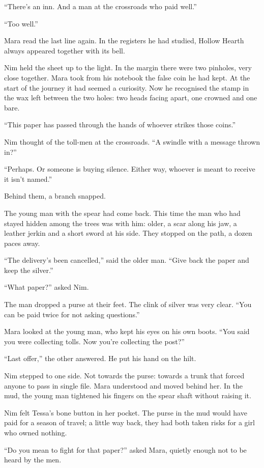 \documentclass[10pt,a4paper]{article}
\begin{document}
“There's an inn. And a man at the crossroads who paid well.”

“Too well.”

Mara read the last line again. In the registers he had studied, Hollow Hearth always appeared together with its bell.

Nim held the sheet up to the light. In the margin there were two pinholes, very close together. Mara took from his notebook the false coin he had kept. At the start of the journey it had seemed a curiosity. Now he recognised the stamp in the wax left between the two holes: two heads facing apart, one crowned and one bare.

“This paper has passed through the hands of whoever strikes those coins.”

Nim thought of the toll-men at the crossroads. “A swindle with a message thrown in?”

“Perhaps. Or someone is buying silence. Either way, whoever is meant to receive it isn't named.”

Behind them, a branch snapped.

The young man with the spear had come back. This time the man who had stayed hidden among the trees was with him: older, a scar along his jaw, a leather jerkin and a short sword at his side. They stopped on the path, a dozen paces away.

“The delivery's been cancelled,” said the older man. “Give back the paper and keep the silver.”

“What paper?” asked Nim.

The man dropped a purse at their feet. The clink of silver was very clear. “You can be paid twice for not asking questions.”

Mara looked at the young man, who kept his eyes on his own boots. “You said you were collecting tolls. Now you're collecting the post?”

“Last offer,” the other answered. He put his hand on the hilt.

Nim stepped to one side. Not towards the purse: towards a trunk that forced anyone to pass in single file. Mara understood and moved behind her. In the mud, the young man tightened his fingers on the spear shaft without raising it.

Nim felt Tessa's bone button in her pocket. The purse in the mud would have paid for a season of travel; a little way back, they had both taken risks for a girl who owned nothing.

“Do you mean to fight for that paper?” asked Mara, quietly enough not to be heard by the men.
\end{document}
